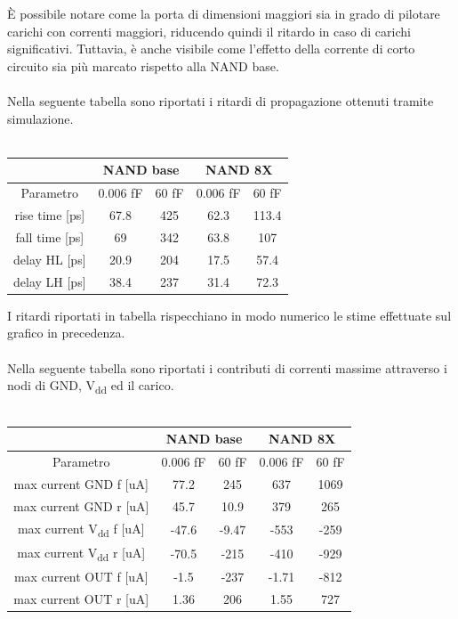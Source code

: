 \documentclass[11pt,  english, makeidx, a4paper, titlepage, oneside]{book}
\begin{document}
\\\\
È possibile notare come la porta di dimensioni maggiori sia in grado di pilotare carichi con correnti maggiori, riducendo quindi il ritardo in caso di carichi significativi. Tuttavia, è anche visibile come l'effetto della corrente di corto circuito sia più marcato rispetto alla NAND base.
\\\\
Nella seguente tabella sono riportati i ritardi di propagazione ottenuti tramite simulazione.
\\\\
\begin{center}
	\begin{tabular}{|c|c|c||c|c|}
	\hline
	& \multicolumn{2}{|c||}{NAND base} & \multicolumn{2}{|c|}{NAND 8X}\\
	\hline
	Parametro & 0.006 fF & 60 fF & 0.006 fF & 60 fF \\
	\hline
	rise time [ps] & 67.8 & 425 & 62.3 & 113.4\\
	\hline
	 fall time [ps] & 69 & 342 & 63.8 & 107 \\
	\hline
	delay HL [ps] & 20.9 & 204 & 17.5 & 57.4  \\
	\hline
	delay LH [ps] & 38.4 & 237 & 31.4 & 72.3 \\
	\hline
	\end{tabular}	
\end{center}
\vspace{0.3cm}
I ritardi riportati in tabella rispecchiano in modo numerico le stime effettuate sul grafico in precedenza.
\\\\
Nella seguente tabella sono riportati i contributi di correnti massime attraverso i nodi di GND, V\textsubscript{dd} ed il carico.
\\\\
\begin{center}
	\begin{tabular}{|c|c|c||c|c|}
	\hline
	& \multicolumn{2}{|c||}{NAND base} & \multicolumn{2}{|c|}{NAND 8X}\\
	\hline
	Parametro & 0.006 fF & 60 fF & 0.006 fF & 60 fF \\
	\hline
	max current GND f [uA] & 77.2 & 245 & 637 & 1069 \\
	\hline
	max current GND r [uA] & 45.7 & 10.9 & 379 & 265 \\
	\hline
	max current V\textsubscript{dd} f [uA] & -47.6 & -9.47 & -553 & -259 \\
	\hline
	max current V\textsubscript{dd} r [uA] & -70.5 & -215 & -410 & -929  \\
	\hline
	max current OUT f [uA] & -1.5 & -237 & -1.71 & -812 \\
	\hline
	max current OUT r [uA] & 1.36 & 206 & 1.55 & 727 \\
	\hline
	\end{tabular}	
\end{center}
\end{document}
